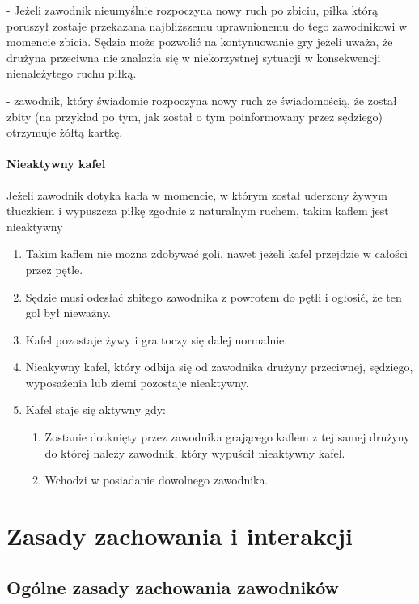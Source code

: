 \documentclass[12pt]{article}
\newcommand\yellowcard{\bgroup\color{yellow}\markoverwith{\textcolor{yellow}{\rule[-0.5ex]{2pt}{0.4pt}}}\ULon}
\newcommand\other{\bgroup\color{green}\markoverwith{\textcolor{green}{\rule[-0.5ex]{2pt}{0.4pt}}}\ULon}
\begin{document}
\other{Strata} - Jeżeli zawodnik nieumyślnie rozpoczyna nowy ruch po
zbiciu, piłka którą poruszył zostaje przekazana najbliższemu
uprawnionemu do tego zawodnikowi w momencie zbicia. Sędzia może pozwolić
na kontynuowanie gry jeżeli uważa, że drużyna przeciwna nie znalazła się
w niekorzystnej sytuacji w konsekwencji nienależytego ruchu piłką.

\yellowcard{Żółta kartka} - zawodnik, który świadomie rozpoczyna nowy ruch ze
świadomością, że został zbity (na przykład po tym, jak został o tym
poinformowany przez sędziego) otrzymuje żółtą kartkę.

\paragraph{Nieaktywny kafel}
Jeżeli zawodnik dotyka kafla w
momencie, w którym został uderzony żywym tłuczkiem i wypuszcza piłkę
zgodnie z naturalnym ruchem, takim kaflem jest nieaktywny

\begin{enumerate}
	\item
	      Takim kaflem nie można zdobywać goli, nawet jeżeli kafel przejdzie w
	      całości przez pętle.
	\item
	      Sędzie musi odesłać zbitego zawodnika z powrotem do pętli i ogłosić,
	      że ten gol był nieważny.
	\item
	      Kafel pozostaje żywy i gra toczy się dalej normalnie.
	\item
	      Nieakywny kafel, który odbija się od zawodnika drużyny przeciwnej,
	      sędziego, wyposażenia lub ziemi pozostaje nieaktywny.
	\item
	      Kafel staje się aktywny gdy:

	      \begin{enumerate}
		      \item
		            Zostanie dotknięty przez zawodnika grającego kaflem z tej samej
		            drużyny do której należy zawodnik, który wypuścił nieaktywny kafel.
		      \item
		            Wchodzi w posiadanie dowolnego zawodnika.
	      \end{enumerate}
\end{enumerate}

\pagebreak
\section{Zasady zachowania i interakcji}

\subsection{Ogólne zasady zachowania zawodników}
\end{document}
